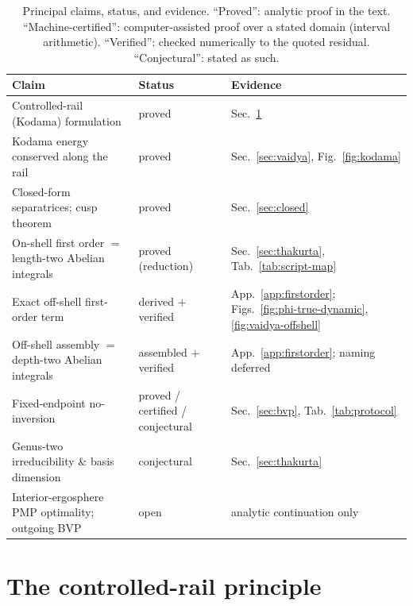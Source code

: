 \documentclass[
    aps, prd, twocolumn, superscriptaddress,
    showpacs, nofootinbib, floatfix
]{revtex4-2}
\begin{document}
\begin{table}[htbp]
    \centering
    \caption{Principal claims, status, and evidence. ``Proved'': analytic proof in the
    text. ``Machine-certified'': computer-assisted proof over a stated domain (interval
    arithmetic). ``Verified'': checked numerically to the quoted residual.
    ``Conjectural'': stated as such.}
    \label{tab:claims}
    \begin{ruledtabular}
    \begin{tabular}{lll}
        Claim & Status & Evidence\\
        \hline
        Controlled-rail (Kodama) formulation & proved & Sec.~\ref{sec:principle}\\
        Kodama energy conserved along the rail & proved & Sec.~\ref{sec:vaidya},
            Fig.~\ref{fig:kodama}\\
        Closed-form separatrices; cusp theorem & proved & Sec.~\ref{sec:closed}\\
        On-shell first order $=$ length-two Abelian integrals & proved (reduction)
            & Sec.~\ref{sec:thakurta}, Tab.~\ref{tab:script-map}\\
        Exact off-shell first-order term & derived $+$ verified
            & App.~\ref{app:firstorder}; Figs.~\ref{fig:phi-true-dynamic},
              \ref{fig:vaidya-offshell}\\
        Off-shell assembly $=$ depth-two Abelian integrals & assembled $+$ verified
            & App.~\ref{app:firstorder}; naming deferred\\
        Fixed-endpoint no-inversion & proved / certified / conjectural
            & Sec.~\ref{sec:bvp}, Tab.~\ref{tab:protocol}\\
        Genus-two irreducibility \& basis dimension & conjectural
            & Sec.~\ref{sec:thakurta}\\
        Interior-ergosphere PMP optimality; outgoing BVP & open
            & analytic continuation only\\
    \end{tabular}
    \end{ruledtabular}
\end{table}


\section{The controlled-rail principle}
\label{sec:principle}
\end{document}
